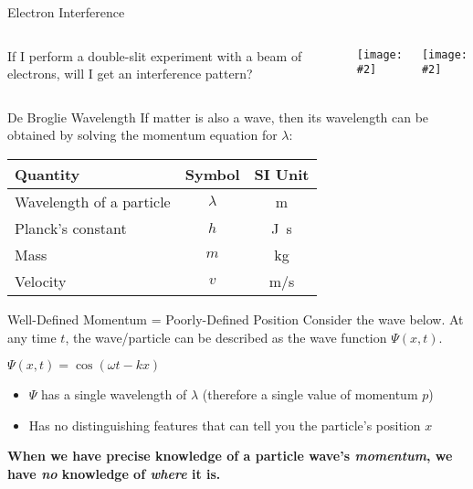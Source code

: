 \documentclass[12pt,compress,aspectratio=169]{beamer}
\newcommand{\pic}[2]{\texttt{[image: \#2]}}
\newcommand{\eq}[2]{\vspace{#1}{\Large\begin{displaymath}#2\end{displaymath}}}
\begin{document}
\begin{frame}{Electron Interference}
  \begin{columns}
    If I perform a double-slit experiment with a beam of electrons, will I get
    an interference pattern?
    \begin{center}
      \pic{.7}{CNX_Chem_06_03_Electrnin}
    \end{center}

    \pic{1}{206px-Double-slit_experiment_results_Tanamura_2.jpg}
  \end{columns}
\end{frame}



\begin{frame}{De Broglie Wavelength}
  If matter is also a wave, then its wavelength can be obtained by solving the
  momentum equation for $\lambda$:

  \eq{-.2in}{
    p=\frac{h}{\lambda}\;\;\rightarrow\;\;
    \lambda=\frac{h}{p}\;\;\rightarrow\;\;\boxed{\lambda=\frac{h}{mv}}
  }

  \vspace{-.1in}
  \begin{center}
    \begin{tabular}{l|c|c}
      \rowcolor{pink}
      \textbf{Quantity} & \textbf{Symbol} & \textbf{SI Unit} \\ \hline
      Wavelength of a particle & $\lambda$ & \si{\metre} \\
      Planck's constant & $h$  & \si{\joule.\second} \\
      Mass              & $m$  & \si{\kilo\gram} \\
      Velocity          & $v$  & \si{\metre/\second}
    \end{tabular}
  \end{center}
\end{frame}




\begin{frame}{Well-Defined Momentum = Poorly-Defined Position}
  Consider the wave below. At any time $t$, the wave/particle can be described
  as the wave function $\Psi(x,t)$.
  \begin{center}
    {\footnotesize $\Psi(x,t)=\cos(\omega t-kx)$}\\
  \end{center}
  \begin{itemize}
  \item $\Psi$ has a single wavelength of $\lambda$ (therefore a single
    value of momentum $p$)
  \item Has no distinguishing features that can tell you the particle's
    position $x$
  \end{itemize} 
  \textbf{When we have precise knowledge of a particle wave's \emph{momentum},
    we have \emph{no} knowledge of \emph{where} it is.}
\end{frame}
\end{document}
